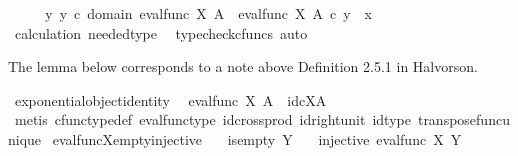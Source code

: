 \begin{isabellebody}
\ \ \isamarkupfalse%
\ \isamarkupfalse%
\ {\isachardoublequoteopen}{\isasymexists}y{\isachardot}{\kern0pt}\ y\ {\isasymin}\isactrlsub c\ domain\ {\isacharparenleft}{\kern0pt}eval{\isacharunderscore}{\kern0pt}func\ X\ A{\isacharparenright}{\kern0pt}\ {\isasymand}\ eval{\isacharunderscore}{\kern0pt}func\ X\ A\ {\isasymcirc}\isactrlsub c\ y\ {\isacharequal}{\kern0pt}\ x{\isachardoublequoteclose}\isanewline
\ \ \ \ \isamarkupfalse%
\ calculation\ needed{\isacharunderscore}{\kern0pt}type\ \isamarkupfalse%
\ {\isacharparenleft}{\kern0pt}typecheck{\isacharunderscore}{\kern0pt}cfuncs{\isacharcomma}{\kern0pt}\ auto{\isacharparenright}{\kern0pt}\isanewline
{}\isamarkupfalse%
%
\endisatagproof
{\isafoldproof}%
%
\isadelimproof
%
\endisadelimproof
%
\begin{isamarkuptext}%
The lemma below corresponds to a note above Definition 2.5.1 in Halvorson.%
\end{isamarkuptext}\isamarkuptrue%
\isamarkupfalse%
\ exponential{\isacharunderscore}{\kern0pt}object{\isacharunderscore}{\kern0pt}identity{\isacharcolon}{\kern0pt}\isanewline
\ \ {\isachardoublequoteopen}{\isacharparenleft}{\kern0pt}eval{\isacharunderscore}{\kern0pt}func\ X\ A{\isacharparenright}{\kern0pt}\isactrlsup {\isasymsharp}\ {\isacharequal}{\kern0pt}\ id\isactrlsub c{\isacharparenleft}{\kern0pt}X\isactrlbsup A\isactrlesup {\isacharparenright}{\kern0pt}{\isachardoublequoteclose}\isanewline
%
\isadelimproof
\ \ %
\endisadelimproof
%
\isatagproof
{}\isamarkupfalse%
\ {\isacharparenleft}{\kern0pt}metis\ cfunc{\isacharunderscore}{\kern0pt}type{\isacharunderscore}{\kern0pt}def\ eval{\isacharunderscore}{\kern0pt}func{\isacharunderscore}{\kern0pt}type\ id{\isacharunderscore}{\kern0pt}cross{\isacharunderscore}{\kern0pt}prod\ id{\isacharunderscore}{\kern0pt}right{\isacharunderscore}{\kern0pt}unit\ id{\isacharunderscore}{\kern0pt}type\ transpose{\isacharunderscore}{\kern0pt}func{\isacharunderscore}{\kern0pt}unique{\isacharparenright}{\kern0pt}%
\endisatagproof
{\isafoldproof}%
%
\isadelimproof
\isanewline
%
\endisadelimproof
\isanewline
{}\isamarkupfalse%
\ eval{\isacharunderscore}{\kern0pt}func{\isacharunderscore}{\kern0pt}X{\isacharunderscore}{\kern0pt}empty{\isacharunderscore}{\kern0pt}injective{\isacharcolon}{\kern0pt}\isanewline
\ \ \ {\isachardoublequoteopen}is{\isacharunderscore}{\kern0pt}empty\ Y{\isachardoublequoteclose}\isanewline
\ \ \ {\isachardoublequoteopen}injective\ {\isacharparenleft}{\kern0pt}eval{\isacharunderscore}{\kern0pt}func\ X\ Y{\isacharparenright}{\kern0pt}{\isachardoublequoteclose}\isanewline

\end{isabellebody}
